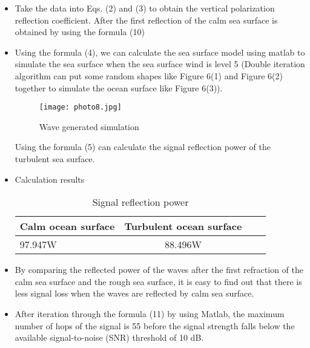 \documentclass{mcmthesis}
\begin{document}
\begin{itemize}
\item Take the data into Eqs. (2) and (3) to obtain the vertical polarization reflection coefficient. After the first reflection of the calm sea surface is obtained by using the formula (10) 
\item Using the formula (4), we can calculate the sea surface model using matlab to simulate the sea surface when the sea surface wind is level 5 (Double iteration algorithm can put some random shapes like Figure 6(1) and Figure 6(2) together to simulate the ocean surface like Figure 6(3)).
\begin{figure}[h]
\small
\centering
\texttt{[image: photo8.jpg]}
\caption{Wave generated simulation} \label{fig:aa}
\end{figure}

Using the formula (5) can calculate the signal reflection power of the turbulent sea surface.
\item Calculation results
\begin{table}[htbp]
\centering  %
\begin{tabular}{lccc}  %
\hline
Calm ocean surface &Turbulent ocean surface\\ \hline  %
97.947W &88.496W\\    \hline     %
\end{tabular}
\caption{Signal reflection power}
\end{table}
\item By comparing the reflected power of the waves after the first refraction of the calm sea surface and the rough sea surface, it is easy to find out that there is less signal loss when the waves are reflected by calm sea surface.
\item After iteration through the formula (11) by using Matlab, the maximum number of hops of the signal is 55 before the signal strength falls below the available signal-to-noise (SNR) threshold of 10 dB.
\end{itemize}
\end{document}
